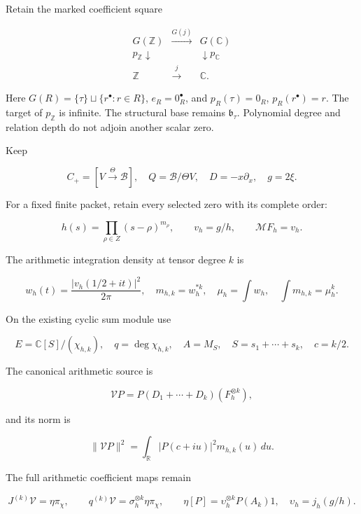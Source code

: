 Retain the marked coefficient square

\[
\begin{array}{ccc}
G(\mathbb Z)&\xrightarrow{G(j)}&G(\mathbb C)\\
p_{\mathbb Z}\downarrow&&\downarrow p_{\mathbb C}\\
\mathbb Z&\xrightarrow{j}&\mathbb C.
\end{array}                                                       \tag{7}
\]

Here \(G(R)=\{\tau\}\sqcup\{r^\bullet:r\in R\}\), \(e_R=0_R^\bullet\), and \(p_R(\tau)=0_R\), \(p_R(r^\bullet)=r\). The target of \(p_{\mathbb Z}\) is infinite. The structural base remains \(\mathfrak b_\tau\). Polynomial degree and relation depth do not adjoin another scalar zero.

Keep

\[
 C_+=[V\xrightarrow{\Theta}\mathscr B],\quad
 Q=\mathscr B/\Theta V,\quad D=-x\partial_x,\quad g=2\xi.          \tag{8}
\]

For a fixed finite packet, retain every selected zero with its complete order:

\[
 h(s)=\prod_{\rho\in Z}(s-\rho)^{m_\rho},\qquad
 v_h=g/h,\qquad\mathcal MF_h=v_h.                                \tag{9}
\]

The arithmetic integration density at tensor degree \(k\) is

\[
 w_h(t)=\frac{|v_h(1/2+it)|^2}{2\pi},\quad
 m_{h,k}=w_h^{*k},\quad
 \mu_h=\int w_h,\quad\int m_{h,k}=\mu_h^k.                        \tag{10}
\]

On the existing cyclic sum module use

\[
 E=\mathbb C[S]/(\chi_{h,k}),\quad q=\deg\chi_{h,k},\quad
 A=M_S,\quad S=s_1+\cdots+s_k,\quad c=k/2.                        \tag{11}
\]

The canonical arithmetic source is

\[
 \mathcal V P=P(D_1+\cdots+D_k)(F_h^{\otimes k}),                 \tag{12}
\]

and its norm is

\[
 \|\mathcal V P\|^2
 =\int_{\mathbb R}|P(c+iu)|^2m_{h,k}(u)\,du.                     \tag{13}
\]

The full arithmetic coefficient maps remain

\[
 J^{(k)}\mathcal V=\eta\pi_\chi,\qquad
 q^{(k)}\mathcal V=\sigma_h^{\otimes k}\eta\pi_\chi,\qquad
 \eta[P]=\upsilon_h^{\otimes k}P(A_k)1,\quad
 \upsilon_h=j_h(g/h).                                            \tag{14}
\]

